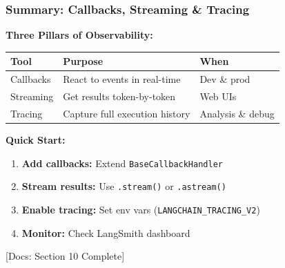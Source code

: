 \documentclass[aspectratio=169,11pt]{beamer}
\newcommand{\docref}[1]{{\scriptsize\color{docgray}[Docs: #1]}}
\begin{document}
\begin{frame}
  \frametitle{Summary: Callbacks, Streaming \& Tracing}

  \textbf{Three Pillars of Observability:}

  \vspace{0.1cm}

  \begin{table}
    \small
    \centering
    \begin{tabular}{p{1.8cm}p{3.5cm}p{2.5cm}}
      \toprule
      \textbf{Tool} & \textbf{Purpose} & \textbf{When} \\
      \midrule
      Callbacks & React to events in real-time & Dev \& prod \\
      Streaming & Get results token-by-token & Web UIs \\
      Tracing & Capture full execution history & Analysis \& debug \\
      \bottomrule
    \end{tabular}
  \end{table}

  \vspace{0.15cm}

  \textbf{Quick Start:}
  \begin{enumerate}
    \setlength{\itemsep}{1pt}
    \item \textbf{Add callbacks:} Extend \texttt{BaseCallbackHandler}
    \item \textbf{Stream results:} Use \texttt{.stream()} or \texttt{.astream()}
    \item \textbf{Enable tracing:} Set env vars (\texttt{LANGCHAIN\_TRACING\_V2})
    \item \textbf{Monitor:} Check LangSmith dashboard
  \end{enumerate}

  \vspace{0.15cm}

  \docref{Section 10 Complete}
\end{frame}

\end{document}
